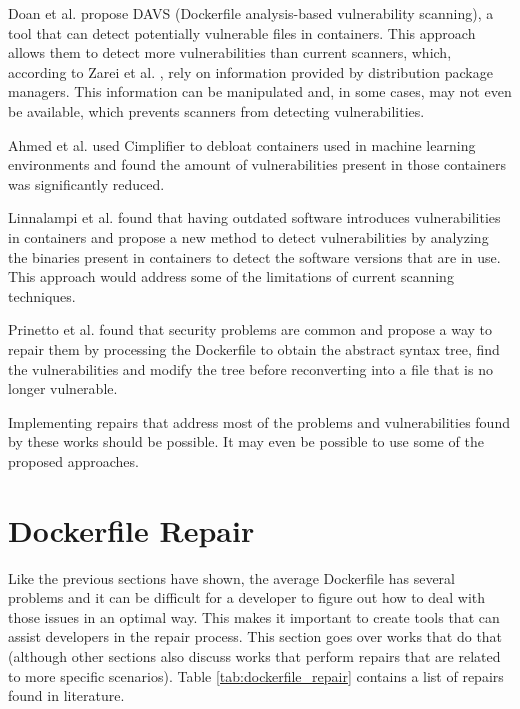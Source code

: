 Doan et al. \cite{doanDAVSDockerfileAnalysis2022} propose DAVS (Dockerfile analysis-based vulnerability scanning), a tool that can detect potentially vulnerable files in containers. This approach allows them to detect more vulnerabilities than current scanners, which, according to Zarei et al. \cite{zareiInvestigatingInnerWorkings2022}, rely on information provided by distribution package managers. This information can be manipulated and, in some cases, may not even be available, which prevents scanners from detecting vulnerabilities.

Ahmed et al. \cite{ahmedSecurityAnalysisCode2022} used Cimplifier \cite{rastogiCimplifierAutomaticallyDebloating2017} to debloat containers used in machine learning environments and found the amount of vulnerabilities present in those containers was significantly reduced.

Linnalampi et al. \cite{linnalampiOutdatedSoftwareContainer2021} found that having outdated software introduces vulnerabilities in containers and propose a new method to detect vulnerabilities by analyzing the binaries present in containers to detect the software versions that are in use. This approach would address some of the limitations of current scanning techniques.

Prinetto et al. \cite{prinettoSecurityMisconfigurationsDetection} found that security problems are common and propose a way to repair them by processing the Dockerfile to obtain the abstract syntax tree, find the vulnerabilities and modify the tree before reconverting into a file that is no longer vulnerable.

Implementing repairs that address most of the problems and vulnerabilities found by these works should be possible. It may even be possible to use some of the proposed approaches.

\section{Dockerfile Repair} \label{sec:dockerfile_repair}

Like the previous sections have shown, the average Dockerfile has several problems and it can be difficult for a developer to figure out how to deal with those issues in an optimal way. This makes it important to create tools that can assist developers in the repair process. This section goes over works that do that (although other sections also discuss works that perform repairs that are related to more specific scenarios). Table \ref{tab:dockerfile_repair} contains a list of repairs found in literature.

